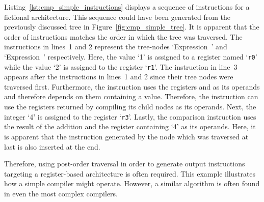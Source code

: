 
Listing~\ref{lst:cmp_simple_instructions} displays a sequence of instructions for a fictional architecture.
This sequence could have been generated from the previously discussed tree in Figure~\ref{fig:cmp_simple_tree}.
It is apparent that the order of instructions matches the order in which the tree was traversed.
The instructions in lines~1 and 2 represent the tree-nodes `Expression~' and `Expression~' respectively.
Here, the value `1' is assigned to a register named `\texttt{r0}' while the value `2' is assigned to the register `\texttt{r1}'.
The  instruction in line~3 appears after the instructions in lines~1 and 2 since their tree nodes were traversed first.
Furthermore, the instruction uses the registers  and  as its operands and therefore depends on them containing a value.
Therefore, the  instruction can use the registers returned by compiling its child nodes as its operands.
Next, the integer `4' is assigned to the register `\texttt{r3}'.
Lastly, the comparison instruction  uses the result of the addition and the register containing `4' as its operands.
Here, it is apparent that the instruction generated by the node which was traversed at last is also inserted at the end.

Therefore, using post-order traversal in order to generate output instructions targeting a register-based architecture is often required.
This example illustrates how a simple compiler might operate.
However, a similar algorithm is often found in even the most complex compilers.
